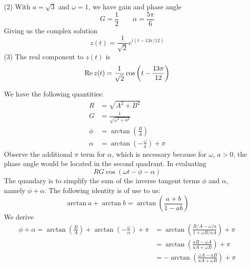 \documentclass[a4paper]{article}
\begin{document}
(2) With \(a = \sqrt{3}\) and \(\omega = 1\), we have gain and phase angle
\[
	G = \frac{1}{2} \qquad \alpha = \frac{5 \pi }{6}
\]
Giving us the complex solution
\[
	z \!\left( t \right) = \frac{1}{\sqrt{2}}e^{i \!\left( t - 13 \pi /12 \right) }
\]
(3) The real component to \(z \!\left( t \right) \) is
\[
	\operatorname{Re} z \!\left( t \right) = \frac{1}{\sqrt{2}} \cos\left( t - \frac{13 \pi }{12} \right)
\]


We have the following quantities:
\begin{align*}
	R & = \sqrt{A^{2} + B^{2}} \\
	G & = \frac{1}{\sqrt{\omega^{2} + a^{2}}} \\ 
	\phi & = \arctan \!\left( \frac{B}{A} \right) \\
	\alpha & = \arctan \!\left( -\frac{\omega }{a} \right) + \pi 
\end{align*}
Observe the additional \(\pi \) term for \(\alpha \), which is necessary because for \(\omega\), \(a > 0\), the phase angle would be located in the second quadrant. In evaluating
\[
	RG \cos\left( \omega t - \phi - \alpha  \right)
\]
The quandary is to simplify the sum of the inverse tangent terms \(\phi \) and \(\alpha \), namely \(\phi + \alpha \). The following identity is of use to us:
\[
	\arctan a + \arctan b = \arctan \!\left( \frac{a + b}{1 - ab} \right) 
\]
We derive
\begin{align*}
	\phi + \alpha = \arctan \!\left( \frac{B}{A} \right) + \arctan \!\left( -\frac{\omega}{\alpha } \right) + \pi  & = \arctan \!\left( \frac{B/A - \omega / a}{1 + \omega B / aA} \right) + \pi  \\
	 & = \arctan \!\left( \frac{aB - \omega A}{aA + \omega B} \right) + \pi  \\ 
	 & = - \arctan \!\left( \frac{\omega A - aB}{aA + \omega B} \right) + \pi 
\end{align*}
\end{document}
